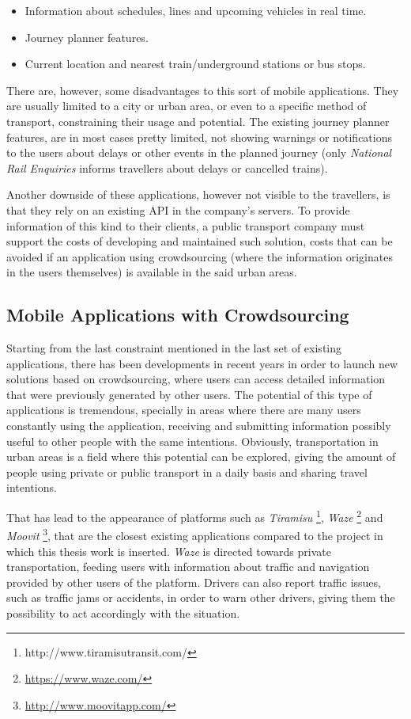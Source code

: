 \begin{itemize}
\item Information about schedules, lines and upcoming vehicles in real time.
\item Journey planner features.
\item Current location and nearest train/underground stations or bus stops.
\end{itemize}

There are, however, some disadvantages to this sort of mobile applications. They are usually limited to a city or urban area, or even to a specific method of transport, constraining their usage and potential.
The existing journey planner features, are in most cases pretty limited, not showing warnings or notifications to the users about delays or other events in the planned journey (only \emph{National Rail Enquiries} informs travellers about delays or cancelled trains).

Another downside of these applications, however not visible to the travellers, is that they rely on an existing API in the company's servers. To provide information of this kind to their clients, a public transport company must support the costs of developing and maintained such solution, costs that can be avoided if an application using crowdsourcing (where the information originates in the users themselves) is available in the said urban areas.

\subsection{Mobile Applications with Crowdsourcing}

Starting from the last constraint mentioned in the last set of existing applications, there has been developments in recent years in order to launch new solutions based on crowdsourcing, where users can access detailed information that were previously generated by other users. The potential of this type of applications is tremendous, specially in areas where there are many users  constantly using the application, receiving and submitting information possibly useful to other people with the same intentions. 
Obviously, transportation in urban areas is a field where this potential can be explored, giving the amount of people using private or public transport in a daily basis and sharing travel intentions.

That has lead to the appearance of platforms such as \emph{Tiramisu} \footnote{http://www.tiramisutransit.com/}, \emph{Waze} \footnote{\url{https://www.waze.com/}} and \emph{Moovit} \footnote{\url{http://www.moovitapp.com/}},  that are the closest existing applications compared to the project in which this thesis work is inserted.
\emph{Waze} is directed towards private transportation, feeding users with information about traffic and navigation provided by other users of the platform. Drivers can also report traffic issues, such as traffic jams or accidents, in order to warn other drivers, giving them the possibility to act accordingly with the situation.

